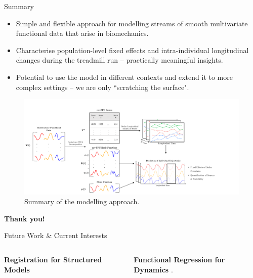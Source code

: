 \documentclass[aspectratio=128,xcolor=dvipsnames, notes]{beamer}
\newcommand{\1}{\mathbf{1}}
\begin{document}
\begin{frame}{Summary}
\begin{itemize}
    \pause \item Simple and flexible approach for modelling streams of smooth multivariate functional data that arise in biomechanics.
    \pause \item Characterise population-level fixed effects and intra-individual longitudinal changes during the treadmill run -- practically meaningful insights.
    \pause \item Potential to use the model in different contexts and extend it to more complex settings -- we are only ``scratching the surface".
\end{itemize}
\begin{figure}
    \centering
    \includegraphics[width=0.65\linewidth]{methods-schematic.pdf}
    \caption{Summary of the modelling approach.}
    \label{fig:enter-label}
\end{figure}
\end{frame}

\begin{frame}
    \vfill
    \Huge{\centerline{\textbf{Thank you!}}}
    \vfill
\end{frame}

\begin{frame}{Future Work \& Current Interests}
    
\begin{columns}
    \textbf{Registration for Structured Models}

    \textbf{Functional Regression for Dynamics}
    \textcite{gunning_understanding_2023}.
\end{columns}
    
\end{frame}
\end{document}
